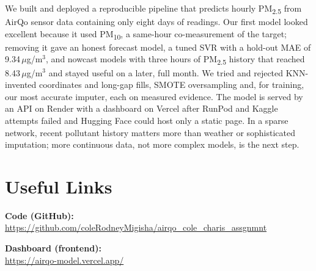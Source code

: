 \documentclass{ieeeaccess}
\newcommand{\ugm}{\,$\mu$g/m$^{3}$}
\newcommand{\pmtwo}{PM\textsubscript{2.5}}
\newcommand{\pmten}{PM\textsubscript{10}}
\begin{document}
We built and deployed a reproducible pipeline that predicts hourly \pmtwo{} from AirQo sensor data containing only eight days of readings. Our first model looked excellent because it used \pmten{}, a same-hour co-measurement of the target; removing it gave an honest forecast model, a tuned SVR with a hold-out MAE of 9.34\ugm{}, and nowcast models with three hours of \pmtwo{} history that reached 8.43\ugm{} and stayed useful on a later, full month. We tried and rejected KNN-invented coordinates and long-gap fills, SMOTE oversampling and, for training, our most accurate imputer, each on measured evidence. The model is served by an API on Render with a dashboard on Vercel after RunPod and Kaggle attempts failed and Hugging Face could host only a static page. In a sparse network, recent pollutant history matters more than weather or sophisticated imputation; more continuous data, not more complex models, is the next step.

\section*{Useful Links}
\noindent\textbf{Code (GitHub):}\\
\url{https://github.com/coleRodneyMigisha/airqo_cole_charis_assgnmnt}

\noindent\textbf{Dashboard (frontend):}\\
\url{https://airqo-model.vercel.app/}
\end{document}
